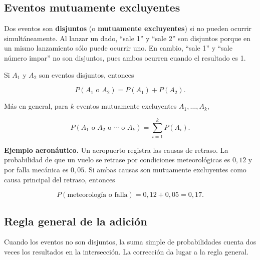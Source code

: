 \documentclass[
  spanish,
  letterpaper,
  DIV=11,
  numbers=noendperiod]{scrartcl}
\begin{document}
\subsection{Eventos mutuamente
excluyentes}\label{eventos-mutuamente-excluyentes}

Dos eventos son \textbf{disjuntos} (o \textbf{mutuamente excluyentes})
si no pueden ocurrir simultáneamente. Al lanzar un dado, ``sale 1'' y
``sale 2'' son disjuntos porque en un mismo lanzamiento sólo puede
ocurrir uno. En cambio, ``sale 1'' y ``sale número impar'' no son
disjuntos, pues ambos ocurren cuando el resultado es 1.

\begin{tcolorbox}[enhanced jigsaw, arc=.35mm, bottomrule=.15mm, bottomtitle=1mm, breakable, colback=white, colbacktitle=quarto-callout-important-color!10!white, colframe=quarto-callout-important-color-frame, coltitle=black, left=2mm, leftrule=.75mm, opacityback=0, opacitybacktitle=0.6, rightrule=.15mm, title=\textcolor{quarto-callout-important-color}{\faExclamation}\hspace{0.5em}{Regla de la adición para eventos disjuntos}, titlerule=0mm, toprule=.15mm, toptitle=1mm]

Si \(A_1\) y \(A_2\) son eventos disjuntos, entonces

\[P(A_1 \text{ o } A_2) = P(A_1) + P(A_2).\]

Más en general, para \(k\) eventos mutuamente excluyentes
\(A_1, \ldots, A_k\),

\[P(A_1 \text{ o } A_2 \text{ o } \cdots \text{ o } A_k) = \sum_{i=1}^{k} P(A_i).\]

\end{tcolorbox}

\textbf{Ejemplo aeronáutico.} Un aeropuerto registra las causas de
retraso. La probabilidad de que un vuelo se retrase por condiciones
meteorológicas es \(0{,}12\) y por falla mecánica es \(0{,}05\). Si
ambas causas son mutuamente excluyentes como causa principal del
retraso, entonces

\[P(\text{meteorología o falla}) = 0{,}12 + 0{,}05 = 0{,}17.\]

\subsection{Regla general de la
adición}\label{regla-general-de-la-adiciuxf3n}

Cuando los eventos no son disjuntos, la suma simple de probabilidades
cuenta dos veces los resultados en la intersección. La corrección da
lugar a la regla general.
\end{document}
